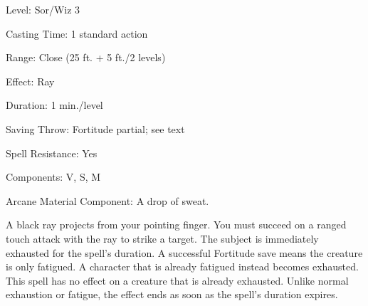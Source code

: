 
\begin{description*}
\item[Level:] Sor/Wiz 3
\item[Casting Time:] 1 standard action
\item[Range:] Close (25 ft. + 5 ft./2 levels)
\item[Effect:] Ray
\item[Duration:] 1 min./level
\item[Saving Throw:] Fortitude partial; see text
\item[Spell Resistance:] Yes
\item[Components:] V, S, M
\item[Arcane Material Component:] A drop of sweat.
\end{description*}

A black ray projects from your pointing finger. You must succeed on a ranged touch
attack with the ray to strike a target.
The subject is immediately exhausted for the spell's duration. A successful Fortitude
save means the creature is only fatigued.
A character that is already fatigued instead becomes exhausted.
This spell has no effect on a creature that is already exhausted. Unlike normal
exhaustion or fatigue, the effect ends as soon as the spell's duration expires.